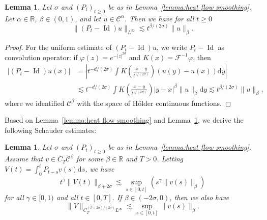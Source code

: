 \documentclass[a4paper,11pt]{article}
\newcommand{\mathd}{\mathrm{d}}
\newcommand{\tmop}[1]{\ensuremath{\operatorname{#1}}}
\newtheorem{lemma}[theorem]{Lemma}
\theoremstyle{remark}
\newtheorem{remark}[theorem]{Remark}
\newcommand{\CC}{\ensuremath{\mathscr{C}}}
\begin{document}


\begin{lemma}\label{lemma:semigroup hoelder in time}
   Let $\sigma$ and $(P_t)_{t \geqslant 0}$ be as in Lemma~\ref{lemma:heat flow smoothing}. Let $\alpha \in \mathbb{R}$, $\beta \in (0,1)$, and let $u \in \CC^{\alpha}$. Then we have for all $t \geqslant 0$
  \[
     \| ( P_{t} - \tmop{Id} ) u \|_{L^{\infty}} \lesssim t^{\beta / ( 2 \sigma )} \| u \|_{\beta}.
  \]
\end{lemma}

\begin{proof}
  For the uniform estimate of $( P_{t} - \tmop{Id} ) u$, we write $P_{t} - \tmop{Id}$ as convolution operator: if $\varphi ( z ) =e^{- | z |^{2\sigma}}$ and $K ( x ) =\mathcal{F}^{-1} \varphi$, then
  \begin{align*}
     | ( P_{t} - \tmop{Id} ) u ( x ) | & = \left| t^{-d/ ( 2 \sigma )} \int K \left( \frac{x-y}{t^{1/ ( 2 \sigma )}} \right) ( u ( y ) -u ( x ) ) \mathd y \right| \\
     & \lesssim t^{-d/ ( 2 \sigma )} \int K \left( \frac{x-y}{t^{1/ ( 2 \sigma )}} \right) | y-x |^{\beta} \| u \|_{\beta} \mathd y \lesssim t^{\beta / ( 2 \sigma )} \| u \|_{\beta},
  \end{align*}
  where we identified $\CC^{\beta}$ with the space of H{\"o}lder continuous functions.
\end{proof}

Based on Lemma~\ref{lemma:heat flow smoothing} and Lemma~\ref{lemma:semigroup hoelder in time}, we derive the following Schauder estimates:

\begin{lemma}\label{lemma:schauder}
  Let $\sigma$ and $(P_t)_{t \geqslant 0}$ be as in Lemma~\ref{lemma:heat flow smoothing}. Assume that $v \in C_{T} \CC^{\beta}$ for some $\beta \in \mathbb{R}$ and $T>0$. Letting $V ( t ) = \int_{0}^{t} P_{t-s} v ( s ) \mathd s$, we have
  \begin{equation}\label{eq:schauder-heat}
     t^{\gamma} \| V ( t ) \|_{\beta +2 \sigma} \lesssim \sup_{s \in [ 0,t ]} ( s^{\gamma} \| v ( s ) \|_{\beta} )
  \end{equation}
  for all $\gamma \in [ 0,1 )$ and all $t \in [ 0,T ]$. If $ \beta \in (-2\sigma,0)$, then we also have
  \begin{equation}\label{eq:holder-est-heat}
     \| V \|_{C_{T}^{( \beta +2\sigma ) / ( 2 \sigma )} L^{\infty}} \lesssim \sup_{s \in [ 0,t ]} \| v ( s ) \|_{\beta} .
  \end{equation}
\end{lemma}
\end{document}
